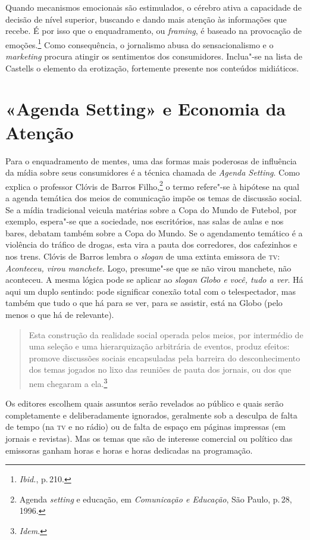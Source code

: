 Quando mecanismos emocionais
são estimulados, o cérebro ativa a capacidade de decisão de nível
superior, buscando e dando mais atenção às informações que recebe. É por
isso que o enquadramento, ou \textit{framing}, é baseado na provocação de
emoções.\footnote{\textit{Ibid.}, p.\,210.} Como consequência, o jornalismo abusa do
sensacionalismo e o \textit{marketing} procura atingir os sentimentos dos
consumidores. Inclua"-se na lista de Castells o elemento da erotização,
fortemente presente nos conteúdos midiáticos.

\section{«Agenda Setting» e Economia da Atenção}

Para o enquadramento de mentes, uma das formas mais poderosas de
influência da mídia sobre seus consumidores é a técnica chamada de
\textit{Agenda Setting}. Como explica o professor Clóvis de Barros Filho,\footnote{Agenda \textit{setting} e educação, em \textit{Comunicação e Educação}, São Paulo, p.\,28, 1996.} o termo refere"-se à hipótese na qual a agenda temática
dos meios de comunicação impõe os temas de discussão social. Se a mídia
tradicional veicula matérias sobre a Copa do Mundo de Futebol, por
exemplo, espera"-se que a sociedade, nos escritórios, nas salas de aulas
e nos bares, debatam também sobre a Copa do Mundo. Se o agendamento
temático é a violência do tráfico de drogas, esta vira a pauta dos
corredores, dos cafezinhos e nos trens. Clóvis de Barros lembra o
\textit{slogan} de uma extinta emissora de \textsc{tv}: \textit{Aconteceu, virou
manchete}. Logo, presume"-se que se não virou manchete, não aconteceu.
A mesma lógica pode se aplicar ao \textit{slogan} \textit{Globo e você,
tudo a ver}. Há aqui um duplo sentindo: pode significar conexão total
com o telespectador, mas também que tudo o que há para se ver, para se
assistir, está na Globo (pelo menos o que há de relevante).

\begin{quote}
Esta construção da realidade social operada pelos meios, por
intermédio de uma seleção e uma hierarquização arbitrária de eventos,
produz efeitos: promove discussões sociais encapsuladas pela barreira do
desconhecimento dos temas jogados no lixo das reuniões de pauta dos
jornais, ou dos que nem chegaram a ela.\footnote{\textit{Idem}.}
\end{quote}

Os editores escolhem quais assuntos serão revelados ao público e quais
serão completamente e deliberadamente ignorados, geralmente sob a
desculpa de falta de tempo (na \textsc{tv} e no rádio) ou de falta de espaço em
páginas impressas (em jornais e revistas). Mas os temas que são de
interesse comercial ou político das emissoras ganham horas e horas e
horas dedicadas na programação.

